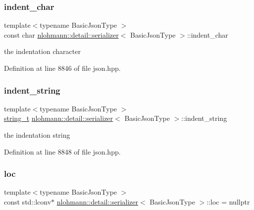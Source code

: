 \subsubsection{\texorpdfstring{indent\+\_\+char}{indent\_char}}
{\footnotesize\ttfamily template$<$typename Basic\+Json\+Type $>$ \\
const char \hyperlink{classnlohmann_1_1detail_1_1serializer}{nlohmann\+::detail\+::serializer}$<$ Basic\+Json\+Type $>$\+::indent\+\_\+char\hspace{0.3cm}{\ttfamily [private]}}



the indentation character 



Definition at line 8846 of file json.\+hpp.

\mbox{\label{classnlohmann_1_1detail_1_1serializer_ae9268a10d88a5526e32735a55a132fc6}} 
\subsubsection{\texorpdfstring{indent\+\_\+string}{indent\_string}}
{\footnotesize\ttfamily template$<$typename Basic\+Json\+Type $>$ \\
\hyperlink{classnlohmann_1_1detail_1_1serializer_ad08aa54fac1dd0a453320c54137d45ba}{string\+\_\+t} \hyperlink{classnlohmann_1_1detail_1_1serializer}{nlohmann\+::detail\+::serializer}$<$ Basic\+Json\+Type $>$\+::indent\+\_\+string\hspace{0.3cm}{\ttfamily [private]}}



the indentation string 



Definition at line 8848 of file json.\+hpp.

\mbox{\label{classnlohmann_1_1detail_1_1serializer_a1952945b7652afb59d3903cc8457a589}} 
\subsubsection{\texorpdfstring{loc}{loc}}
{\footnotesize\ttfamily template$<$typename Basic\+Json\+Type $>$ \\
const std\+::lconv$\ast$ \hyperlink{classnlohmann_1_1detail_1_1serializer}{nlohmann\+::detail\+::serializer}$<$ Basic\+Json\+Type $>$\+::loc = nullptr\hspace{0.3cm}{\ttfamily [private]}}



